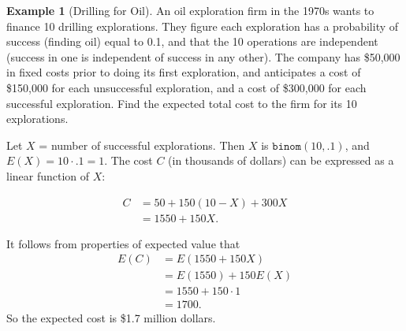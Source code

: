 \documentclass[
]{book}
\theoremstyle{definition}
\theoremstyle{definition}
\newtheorem{example}{Example}[chapter]
\theoremstyle{definition}
\theoremstyle{definition}
\theoremstyle{remark}
\begin{document}
\begin{example}[Drilling for Oil]
\protect\hypertarget{exm:binomial-oil}{}\label{exm:binomial-oil}An oil exploration firm in the 1970s wants to finance 10 drilling explorations. They figure each exploration has a probability of success (finding oil) equal to 0.1, and that the 10 operations are independent (success in one is independent of success in any other). The company has \$50,000 in fixed costs prior to doing its first exploration, and anticipates a cost of \$150,000 for each unsuccessful exploration, and a cost of \$300,000 for each successful exploration. Find the expected total cost to the firm for its 10 explorations.

Let \(X\) = number of successful explorations. Then \(X\) is \(\texttt{binom}(10,.1)\), and \(E(X) = 10 \cdot .1 = 1.\)
The cost \(C\) (in thousands of dollars) can be expressed as a linear function of \(X\):

\begin{align*}
C &= 50 + 150(10-X)+300X\\
  &= 1550 + 150X.
\end{align*}

It follows from properties of expected value that
\begin{align*}
E(C) &= E(1550 + 150X)\\
     &= E(1550) + 150E(X)\\
     &= 1550 + 150 \cdot 1 \\
     &= 1700.
\end{align*}
So the expected cost is \$1.7 million dollars.
\end{example}
\end{document}
